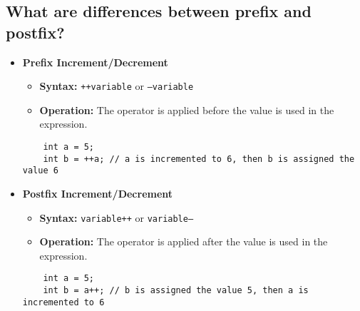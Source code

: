 \subsection{What are differences between prefix and postfix?}
\begin{itemize}
    \item \textbf{Prefix Increment/Decrement}
        \begin{itemize}
        \item \textbf{Syntax:} \texttt{++variable} or \texttt{--variable}
        \item \textbf{Operation:} The operator is applied before the value is used in the expression.
        \end{itemize}
    \begin{tcolorbox}[title=Prefix]
    \begin{verbatim}
    int a = 5;
    int b = ++a; // a is incremented to 6, then b is assigned the value 6
    \end{verbatim}
    \end{tcolorbox}
    \item \textbf{Postfix Increment/Decrement}
        \begin{itemize}
        \item \textbf{Syntax:} \texttt{variable++} or \texttt{variable--}
        \item \textbf{Operation:} The operator is applied after the value is used in the expression.
        \end{itemize} 
    \begin{tcolorbox}[title=Postfix]
    \begin{verbatim} 
    int a = 5;
    int b = a++; // b is assigned the value 5, then a is incremented to 6
    \end{verbatim}
    \end{tcolorbox}
\end{itemize}

